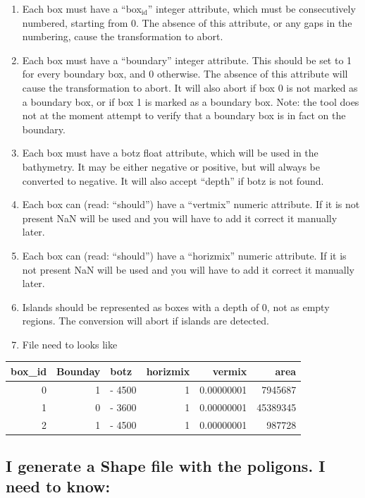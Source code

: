 \documentclass[11pt]{article}
\begin{document}
\begin{enumerate}
\item Each box must have a ``box$_{\mathrm{id}}$'' integer attribute, which must be consecutively numbered, starting from 0.  The absence of this attribute, or any gaps in the numbering, cause the transformation to abort.
\item Each box must have a ``boundary'' integer attribute.  This should be set to 1 for every boundary box, and 0 otherwise.  The absence of this attribute will cause the transformation to abort.  It will also abort if box 0 is not marked as a boundary box, or if box 1 is marked as a boundary box.  Note: the tool does not at the moment attempt to verify that a boundary box is in fact on the boundary.
\item Each box must have a botz float attribute, which will be used in the bathymetry.  It may be either negative or positive, but will always be converted to negative.  It will also accept ``depth'' if botz is not found.
\item Each box can (read: ``should'') have a ``vertmix'' numeric attribute. If it is not present NaN will be used and you will have to add it correct it manually later.
\item Each box can (read: ``should'') have a ``horizmix'' numeric attribute. If it is not present NaN will be used and you will have to add it correct it manually later.
\item Islands should be represented as boxes with a depth of 0, not as empty regions. The conversion will abort if islands are detected.
\item File need to looks like
\end{enumerate}

\begin{center}
\begin{tabular}{rrlrrr}
 box_id  &  Bounday  &  botz    &  horizmix  &      vermix  &      area  \\
\hline
      0  &        1  &  - 4500  &         1  &  0.00000001  &   7945687  \\
      1  &        0  &  - 3600  &         1  &  0.00000001  &  45389345  \\
      2  &        1  &  - 4500  &         1  &  0.00000001  &    987728  \\
\end{tabular}
\end{center}
\subsection*{I generate a Shape file with the poligons. I need to know:}
\label{sec-3-3}
\end{document}
